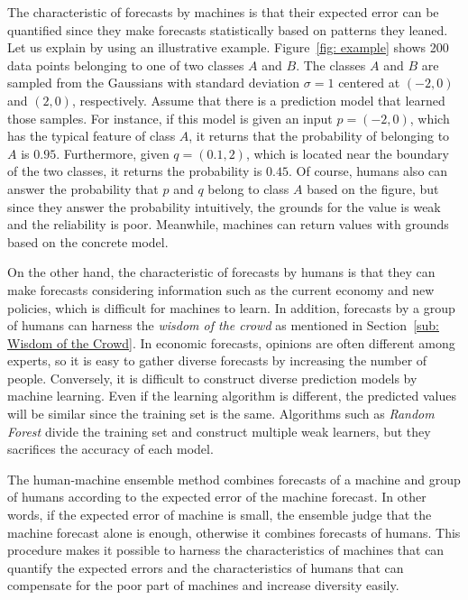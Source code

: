 \documentclass[../main.tex]{subfiles}
\begin{document}
The characteristic of forecasts by machines is that their expected error can be quantified since they make forecasts statistically based on patterns they leaned.
Let us explain by using an illustrative example.
Figure~\ref{fig: example} shows 200 data points belonging to one of two classes $A$ and $B$.
The classes $A$ and $B$ are sampled from the Gaussians with standard deviation $\sigma = 1$ centered at $(-2,0)$ and $(2,0)$, respectively.
Assume that there is a prediction model that learned those samples.
For instance, if this model is given an input $p = (-2,0)$, which has the typical feature of class $A$, it returns that the probability of belonging to $A$ is $0.95$.
Furthermore, given $q=(0.1,2)$, which is located near the boundary of the two classes, it returns the probability is $0.45$.
Of course, humans also can answer the probability that $p$ and $q$ belong to class $A$ based on the figure, but since they answer the probability intuitively, the grounds for the value is weak and the reliability is poor.
Meanwhile, machines can return values with grounds based on the concrete model.

On the other hand, the characteristic of forecasts by humans is that they can make forecasts considering information such as the current economy and new policies, which is difficult for machines to learn.
In addition, forecasts by a group of humans can harness the \emph{wisdom of the crowd} as mentioned in Section~\ref{sub: Wisdom of the Crowd}.
In economic forecasts, opinions are often different among experts, so it is easy to gather diverse forecasts by increasing the number of people.
Conversely, it is difficult to construct diverse prediction models by machine learning.
Even if the learning algorithm is different, the predicted values will be similar since the training set is the same.
Algorithms such as \emph{Random Forest} divide the training set and construct multiple weak learners, but they sacrifices the accuracy of each model.

The human-machine ensemble method combines forecasts of a machine and group of humans according to the expected error of the machine forecast.
In other words, if the expected error of machine is small, the ensemble judge that the machine forecast alone is enough, otherwise it combines forecasts of humans.
This procedure makes it possible to harness the characteristics of machines that can quantify the expected errors and the characteristics of humans that can compensate for the poor part of machines and increase diversity easily.
\end{document}
